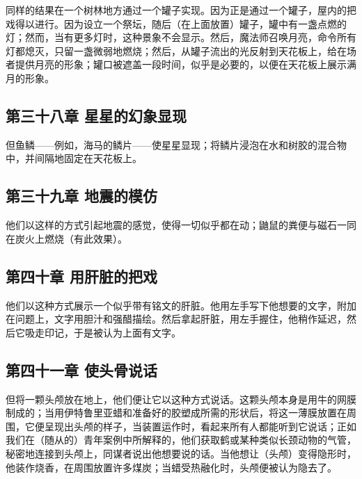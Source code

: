 同样的结果在一个树林地方通过一个罐子实现。因为正是通过一个罐子，屋内的把戏得以进行。因为设立一个祭坛，随后（在上面放置）罐子，罐中有一盏点燃的灯；然而，当有更多灯时，这种景象不会显示。然后，魔法师召唤月亮，命令所有灯都熄灭，只留一盏微弱地燃烧；然后，从罐子流出的光反射到天花板上，给在场者提供月亮的形象；罐口被遮盖一段时间，似乎是必要的，以便在天花板上展示满月的形象。\par


\subsection{第三十八章 星星的幻象显现}

但鱼鳞——例如，海马的鳞片——使星星显现；将鳞片浸泡在水和树胶的混合物中，并间隔地固定在天花板上。\par


\subsection{第三十九章 地震的模仿}

他们以这样的方式引起地震的感觉，使得一切似乎都在动；鼬鼠的粪便与磁石一同在炭火上燃烧（有此效果）。\par


\subsection{第四十章 用肝脏的把戏}

他们以这种方式展示一个似乎带有铭文的肝脏。他用左手写下他想要的文字，附加在问题上，文字用胆汁和强醋描绘。然后拿起肝脏，用左手握住，他稍作延迟，然后它吸走印记，于是被认为上面有文字。\par


\subsection{第四十一章 使头骨说话}

但将一颗头颅放在地上，他们便让它以这种方式说话。这颗头颅本身是用牛的网膜制成的；当用伊特鲁里亚蜡和准备好的胶塑成所需的形状后，将这一薄膜放置在周围，它便呈现出头颅的样子，当装置运作时，看起来所有人都能听到它说话；正如我们在（随从的）青年案例中所解释的，他们获取鹤或某种类似长颈动物的气管，秘密地连接到头颅上，同谋者说出他想要说的话。当他想让（头颅）变得隐形时，他装作烧香，在周围放置许多煤炭；当蜡受热融化时，头颅便被认为隐去了。\par

